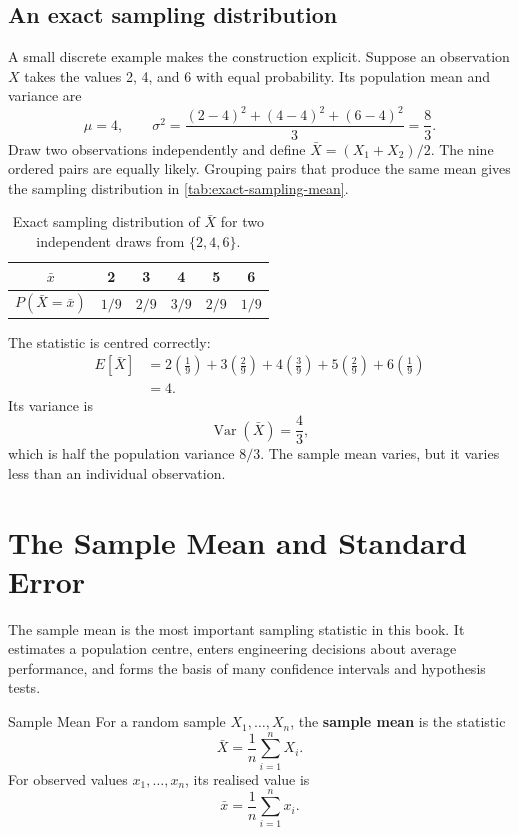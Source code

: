 \subsection{An exact sampling distribution}

A small discrete example makes the construction explicit. Suppose an observation $X$ takes the values 2, 4, and 6 with equal probability. Its population mean and variance are
\[
    \mu=4,
    \qquad
    \sigma^2=\frac{(2-4)^2+(4-4)^2+(6-4)^2}{3}=\frac{8}{3}.
\]
Draw two observations independently and define $\bar X=(X_1+X_2)/2$. The nine ordered pairs are equally likely. Grouping pairs that produce the same mean gives the sampling distribution in \autoref{tab:exact-sampling-mean}.

\begin{table}[htbp]
\centering
\caption{Exact sampling distribution of $\bar X$ for two independent draws from $\{2,4,6\}$.}
\label{tab:exact-sampling-mean}
\begin{tabular}{@{}cccccc@{}}
\toprule
$\bar x$ & 2 & 3 & 4 & 5 & 6 \\
\midrule
$P(\bar X=\bar x)$ & $1/9$ & $2/9$ & $3/9$ & $2/9$ & $1/9$ \\
\bottomrule
\end{tabular}
\end{table}

The statistic is centred correctly:
\[
\begin{aligned}
E[\bar X]
  &=2\left(\frac19\right)+3\left(\frac29\right)
    +4\left(\frac39\right)+5\left(\frac29\right)
    +6\left(\frac19\right)\\
  &=4.
\end{aligned}
\]
Its variance is
\[
    \operatorname{Var}(\bar X)=\frac43,
\]
which is half the population variance $8/3$. The sample mean varies, but it varies less than an individual observation.

\section{The Sample Mean and Standard Error}
\label{sec:sample-mean-standard-error}

The sample mean is the most important sampling statistic in this book. It estimates a population centre, enters engineering decisions about average performance, and forms the basis of many confidence intervals and hypothesis tests.

\begin{definition}{Sample Mean}
For a random sample $X_1,\ldots,X_n$, the \textbf{sample mean} is the statistic
\[
    \bar X=\frac{1}{n}\sum_{i=1}^{n}X_i.
\]
For observed values $x_1,\ldots,x_n$, its realised value is
\[
    \bar x=\frac{1}{n}\sum_{i=1}^{n}x_i.
\]
\end{definition}


